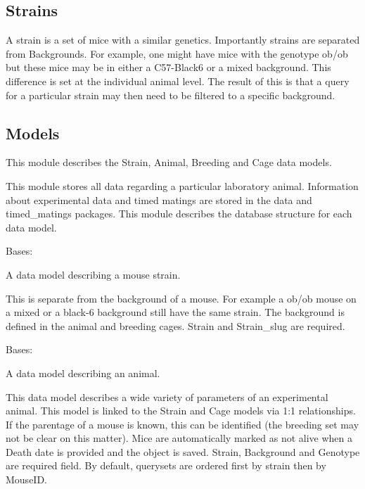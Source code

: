 \documentclass[letterpaper,10pt,english]{sphinxmanual}
\begin{document}
\subsection{Strains}
\label{api:strains}
A strain is a set of mice with a similar genetics.  Importantly strains are separated from Backgrounds.  For example, one might have mice with the genotype ob/ob but these mice may be in either a C57-Black6 or a mixed background.  This difference is set at the individual animal level.  
The result of this is that a query for a particular strain may then need to be filtered to a specific background.



\subsection{Models}
\label{api:id1}\label{api:module-animal.models}
This module describes the Strain, Animal, Breeding and Cage data models.


This module stores all data regarding a particular laboratory animal.  Information about experimental data and timed matings are stored in the data and timed\_matings packages.  This module describes the database structure for each data model.


\begin{fulllineitems}
\label{api:animal.models.Strain}
Bases: 


A data model describing a mouse strain.


This is separate from the background of a mouse.  For example a ob/ob mouse on a mixed or a black-6 background still have the same strain.  The background is defined in the animal and breeding cages.  Strain and Strain\_slug are required.


\end{fulllineitems}


\begin{fulllineitems}
\label{api:animal.models.Animal}
Bases: 


A data model describing an animal.


This data model describes a wide variety of parameters of an experimental animal.  This model is linked to the Strain and Cage models via 1:1 relationships.  If the parentage of a mouse is known, this can be identified (the breeding set may not be clear on this matter). Mice are automatically marked as not alive when a Death date is provided and the object is saved.  Strain, Background and Genotype are required field.  By default, querysets are ordered first by strain then by MouseID.


\end{fulllineitems}
\end{document}
